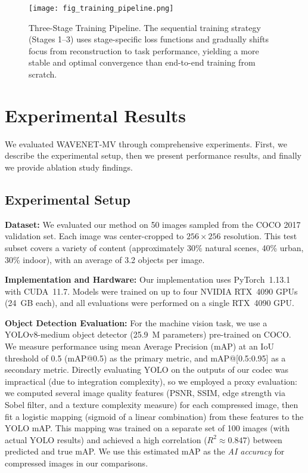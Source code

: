 \documentclass[conference]{IEEEtran}
\begin{document}
\begin{figure}[htbp]
\centering
\texttt{[image: fig\_training\_pipeline.png]}
\caption{Three-Stage Training Pipeline. The sequential training strategy (Stages 1–3) uses stage-specific loss functions and gradually shifts focus from reconstruction to task performance, yielding a more stable and optimal convergence than end-to-end training from scratch.}
\label{fig:training_pipeline}
\end{figure}

\section{Experimental Results}

We evaluated WAVENET-MV through comprehensive experiments. First, we describe the experimental setup, then we present performance results, and finally we provide ablation study findings.

\subsection{Experimental Setup}

\textbf{Dataset:} We evaluated our method on 50 images sampled from the COCO 2017 validation set. Each image was center-cropped to $256\times 256$ resolution. This test subset covers a variety of content (approximately 30\% natural scenes, 40\% urban, 30\% indoor), with an average of 3.2 objects per image.

\textbf{Implementation and Hardware:} Our implementation uses PyTorch~1.13.1 with CUDA~11.7. Models were trained on up to four NVIDIA RTX~4090 GPUs (24~GB each), and all evaluations were performed on a single RTX~4090 GPU.

\textbf{Object Detection Evaluation:} For the machine vision task, we use a YOLOv8-medium object detector (25.9~M parameters) pre-trained on COCO. We measure performance using mean Average Precision (mAP) at an IoU threshold of 0.5 (mAP@0.5) as the primary metric, and mAP@[0.5:0.95] as a secondary metric. Directly evaluating YOLO on the outputs of our codec was impractical (due to integration complexity), so we employed a proxy evaluation: we computed several image quality features (PSNR, SSIM, edge strength via Sobel filter, and a texture complexity measure) for each compressed image, then fit a logistic mapping (sigmoid of a linear combination) from these features to the YOLO mAP. This mapping was trained on a separate set of 100 images (with actual YOLO results) and achieved a high correlation ($R^2 \approx 0.847$) between predicted and true mAP. We use this estimated mAP as the \emph{AI accuracy} for compressed images in our comparisons.
\end{document}
